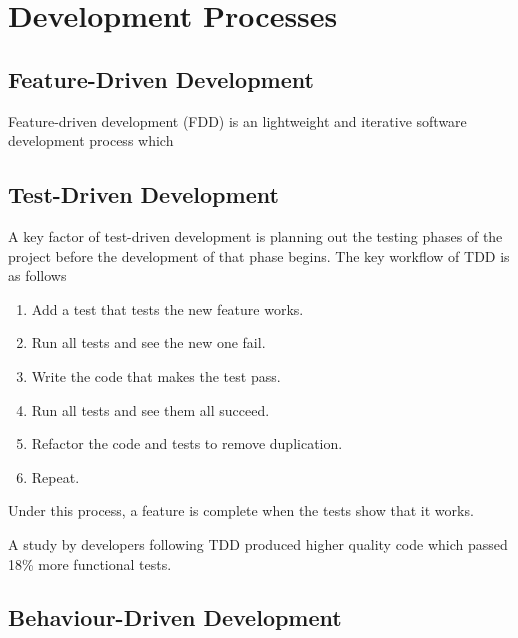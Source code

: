 \section{Development Processes}

\subsection{Feature-Driven Development}
Feature-driven development (FDD) is an lightweight and iterative software development process which 

\subsection{Test-Driven Development}
A key factor of test-driven development is planning out the testing phases of the project before the development of that phase begins.
The key workflow of TDD is as follows \citep{Beck:2002:TDD:579193}
\begin{enumerate}
	\item Add a test that tests the new feature works.
	\item Run all tests and see the new one fail.
	\item Write the code that makes the test pass.
	\item Run all tests and see them all succeed.
	\item Refactor the code and tests to remove duplication.
	\item Repeat.
\end{enumerate}

Under this process, a feature is complete when the tests show that it works.

A study by \cite{George:2003:IIT:952532.952753} developers following TDD produced higher quality code which passed 18\% more functional tests.

\subsection{Behaviour-Driven Development}


